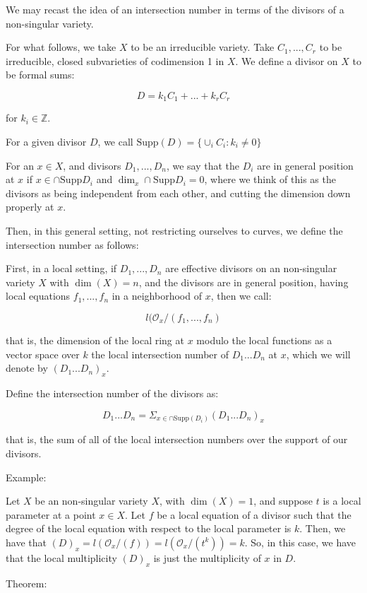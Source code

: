 \documentclass[10pt]{article}
\begin{document}
We may recast the idea of an intersection number in terms of the divisors of a non-singular variety.

For what follows, we take $X$ to be an irreducible variety. Take $C_1,...,C_r$ to be irreducible, closed subvarieties of codimension 1 in $X$. We define a divisor on $X$ to be formal sums:

$$ D = k_1C_1 + ... + k_r C_r $$

for $k_i \in \mathbb{Z}$.

For a given divisor $D$, we call $\text{Supp}(D) = \{ \cup_i C_i : k_i \not = 0 \}$

For an $x \in X$, and divisors $D_1,...,D_n$, we say that the $D_i$ are in general position at $x$ if $x \in \cap \text{Supp} D_i$ and $\dim_x \cap \text{Supp}D_i = 0$, where we think of this as the divisors as being independent from each other, and cutting the dimension down properly at $x$.

Then, in this general setting, not restricting ourselves to curves, we define the intersection number as follows:

First, in a local setting, if $D_1,...,D_n$ are effective divisors on an non-singular variety $X$ with $\dim(X)= n$, and the divisors are in general position, having local equations $f_1,...,f_n$ in a neighborhood of $x$, then we call:

$$l(\mathcal{O}_x / (f_1,...,f_n) $$

that is, the dimension of the local ring at $x$ modulo the local functions as a vector space over $k$ the local intersection number of $D_1...D_n$ at $x$, which we will denote by $(D_1...D_n)_x$.

Define the intersection number of the divisors as:

$$ D_1...D_n = \Sigma_{x \in \cap \text{Supp}(D_i)} (D_1...D_n)_x$$

that is, the sum of all of the local intersection numbers over the support of our divisors.

Example:

Let $X$ be an non-singular variety $X$, with $\dim(X) = 1$, and suppose $t$ is a local parameter at a point $x \in X$. Let $f$ be a local equation of a divisor such that the degree of the local equation with respect to the local parameter is $k$. Then, we have that $(D)_x = l(\mathcal{O}_x/(f)) = l(\mathcal{O}_x/(t^k)) = k$. So, in this case, we have that the local multiplicity $(D)_x$ is just the multiplicity of $x$ in $D$.

Theorem:
\end{document}
